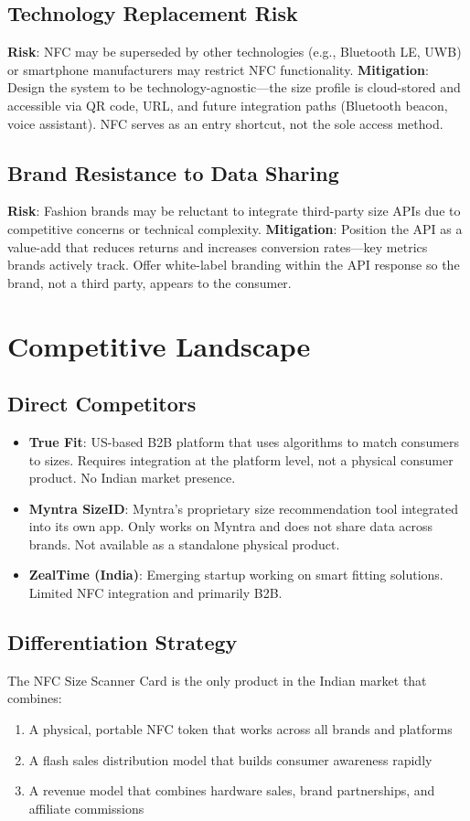 \documentclass[12pt,a4paper]{article}
\begin{document}
\subsection{Technology Replacement Risk}
\textbf{Risk}: NFC may be superseded by other technologies (e.g., Bluetooth LE, UWB) or smartphone manufacturers may restrict NFC functionality.
\textbf{Mitigation}: Design the system to be technology-agnostic---the size profile is cloud-stored and accessible via QR code, URL, and future integration paths (Bluetooth beacon, voice assistant). NFC serves as an entry shortcut, not the sole access method.

\subsection{Brand Resistance to Data Sharing}
\textbf{Risk}: Fashion brands may be reluctant to integrate third-party size APIs due to competitive concerns or technical complexity.
\textbf{Mitigation}: Position the API as a value-add that reduces returns and increases conversion rates---key metrics brands actively track. Offer white-label branding within the API response so the brand, not a third party, appears to the consumer.

\section{Competitive Landscape}

\subsection{Direct Competitors}
\begin{itemize}
    \item \textbf{True Fit}: US-based B2B platform that uses algorithms to match consumers to sizes. Requires integration at the platform level, not a physical consumer product. No Indian market presence.
    \item \textbf{Myntra SizeID}: Myntra's proprietary size recommendation tool integrated into its own app. Only works on Myntra and does not share data across brands. Not available as a standalone physical product.
    \item \textbf{ZealTime (India)}: Emerging startup working on smart fitting solutions. Limited NFC integration and primarily B2B.
\end{itemize}

\subsection{Differentiation Strategy}
The NFC Size Scanner Card is the only product in the Indian market that combines:
\begin{enumerate}
    \item A physical, portable NFC token that works across all brands and platforms
    \item A flash sales distribution model that builds consumer awareness rapidly
    \item A revenue model that combines hardware sales, brand partnerships, and affiliate commissions
\end{enumerate}
\end{document}
